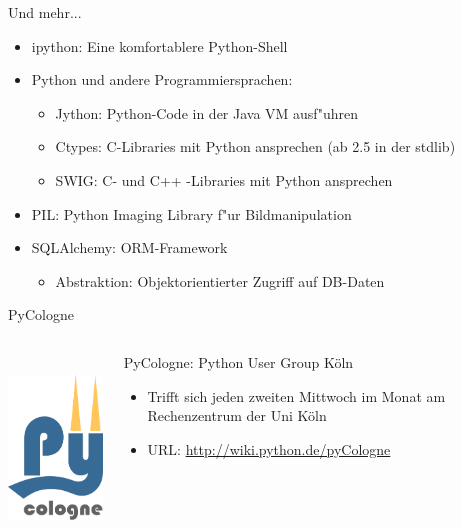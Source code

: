 \begin{frame}[fragile]{Und mehr...}
\begin{itemize}
\item \alert{ipython}: Eine komfortablere Python-Shell
\item Python und andere Programmiersprachen:
\begin{itemize}
\item Jython: Python-Code in der Java VM ausf"uhren
\item Ctypes: C-Libraries mit Python ansprechen (ab 2.5 in der stdlib)
\item SWIG: C- und C++ -Libraries mit Python ansprechen
\end{itemize}
\item \alert{PIL}: Python Imaging Library f"ur Bildmanipulation
\item \alert{SQLAlchemy}: ORM-Framework
\begin{itemize}
\item Abstraktion: Objektorientierter Zugriff auf DB-Daten
\end{itemize}
\end{itemize}
\end{frame}


\begin{frame}{PyCologne}
\begin{columns}
\begin{column}{0.4\textwidth}
  \includegraphics[height=5cm]{images/pycologne7.pdf}
\end{column}
\begin{column}{0.6\textwidth}
  \alert{PyCologne}: Python User Group K\"oln
  \begin{itemize}
    \item Trifft sich jeden zweiten Mittwoch im Monat am Rechenzentrum der Uni K\"oln
    \item URL: \href{http://wiki.python.de/pyCologne}{http://wiki.python.de/pyCologne}
  \end{itemize}
\end{column}
\end{columns}
  
\end{frame}
